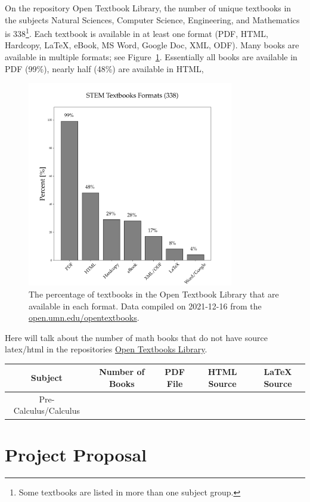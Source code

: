 \documentclass[11pt]{article}
\begin{document}
On the repository Open Textbook Library, the number of unique textbooks in the subjects Natural Sciences, Computer Science, Engineering, and Mathematics is 338\footnote{Some textbooks are listed in more than one subject group.}.  Each textbook is available in at least one format (PDF, HTML, Hardcopy, LaTeX, eBook, MS Word, Google Doc, XML, ODF).  Many books are available in multiple formats; see Figure~\ref{fig:open-book-formats}.  Essentially all books are available in PDF (99\%), nearly half (48\%) are available in HTML, 
\begin{figure}
  \centering
  \includegraphics[width=90mm]{stem-textbook-formats.png}
  \caption{The percentage of textbooks in the Open Textbook Library that are available in each format.  Data compiled on 2021-12-16 from the \href{open.umn.edu/opentextbooks}{open.umn.edu/opentextbooks}.}
  \label{fig:open-book-formats}
\end{figure}

Here will talk about the number of math books that do not have source latex/html in the repositories \href{https://open.umn.edu/opentextbooks}{Open Textbooks Library}.
\begin{table}
\centering
\begin{tabular}{ccccc}\hline
\textbf{Subject} & \textbf{Number of Books} & \textbf{PDF File} & \textbf{HTML Source} & \textbf{LaTeX Source} \\ \hline
Pre-Calculus/Calculus & 
\end{tabular}
\end{table}

\section{Project Proposal}
\end{document}
